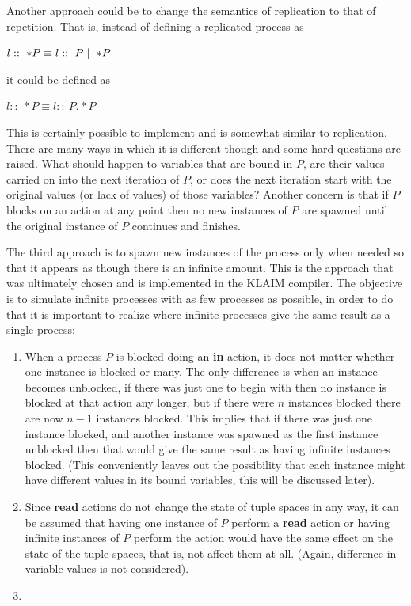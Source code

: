 	Another approach could be to change the semantics of replication
	to that of repetition. That is, instead of defining a replicated
	process as
	\begin{center}$l ::\ * P  \equiv l ::\ P \mid\ * P$\end{center}
	it could be defined as
	\begin{center}$l ::\ * P  \equiv l ::\ P . * P$\end{center}
	This is certainly possible to implement and is somewhat similar to 
	replication. There are many ways in which it is different though and
	some hard questions are raised. What should happen to variables that
	are bound in $P$, are their values carried on into the next iteration of 
	$P$, or does the next iteration start with the original values (or lack
	of values) of those variables? Another concern is that if $P$ blocks on
	an action at any point then no new instances of $P$ are spawned until the
	original instance of $P$ continues and finishes. 
		
	The third approach is to spawn new instances of the process only 
	when needed so that it appears as though there is an infinite amount. This
	is the approach that was ultimately chosen and is implemented in the KLAIM
	compiler. The objective is to simulate infinite processes with as few 
	processes as possible, in order to do that it is important to realize where
	infinite processes give the same result as a single process:
	
	\begin{enumerate}
		\item When a process $P$ is blocked doing an \textbf{in} action, it does 
		not matter whether one instance is blocked or many. The only difference is 
		when an instance becomes unblocked, if there was just one to begin with 
		then no instance is blocked at that action any longer, but if there were 
		$n$ instances blocked there are now $n-1$ instances blocked. This implies
		that if there was just one instance blocked, and another instance was 
		spawned as the first instance unblocked then that would give the same 
		result as having infinite instances blocked. (This conveniently leaves
		out the possibility that each instance might have different values in its 
		bound variables, this will be discussed later).
	
		\item Since \textbf{read} actions do not change the state of tuple spaces
		in any way, it can be assumed that having one instance of $P$ perform a
		\textbf {read} action or having infinite instances of $P$ perform the 
		action would have the same effect on the state of the tuple spaces, that 
		is, not affect them at all. (Again, difference in variable values is not 
		considered).
		
		\item 
		
		
		
		
		
	\end{enumerate}
	
